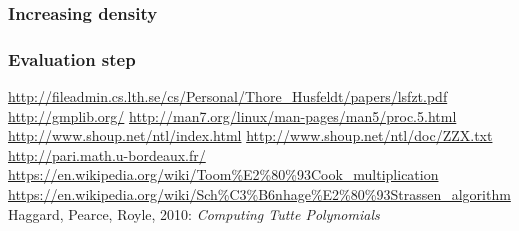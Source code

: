 \documentclass[a4paper]{article}
\begin{document}
\subsubsection{Increasing density}

\subsubsection{Evaluation step}

\newpage
\begin{thebibliography}{9}
 \url{http://fileadmin.cs.lth.se/cs/Personal/Thore_Husfeldt/papers/lsfzt.pdf}
 \url{http://gmplib.org/}
 \url{http://man7.org/linux/man-pages/man5/proc.5.html}
 \url{http://www.shoup.net/ntl/index.html}
 \url{http://www.shoup.net/ntl/doc/ZZX.txt}
 \url{http://pari.math.u-bordeaux.fr/}
 \url{https://en.wikipedia.org/wiki/Toom\%E2\%80\%93Cook_multiplication}
 \url{https://en.wikipedia.org/wiki/Sch\%C3\%B6nhage\%E2\%80\%93Strassen_algorithm}
 Haggard, Pearce, Royle, 2010: \emph{Computing Tutte Polynomials}

\end{thebibliography}
\end{document}
